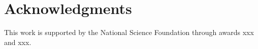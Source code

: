 \section{Acknowledgments}\label{sec:acknowlegments}

This work is supported by the National Science Foundation through awards xxx and xxx. %